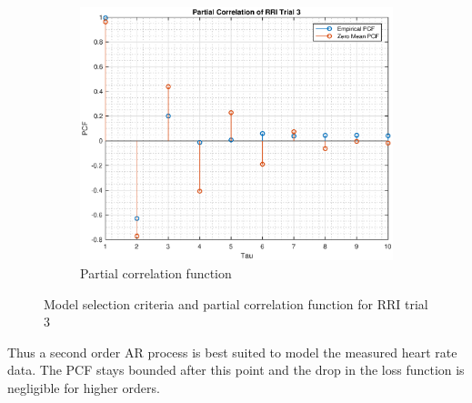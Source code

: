 \documentclass{article}
\begin{document}
\begin{figure}[h!]
\begin{subfigure}{0.32\textwidth}
\centering
\includegraphics[width = \textwidth]{heart_pcf_t3}
\caption{Partial correlation function}
\label{fig:heart_pcf_t3}
\end{subfigure}
\caption{Model selection criteria and partial correlation function for RRI trial 3}
\label{heart_t3}
\end{figure}

Thus a second order AR process is best suited to model the measured heart rate data. The PCF stays bounded after this point and the drop in the loss function is negligible for higher orders.
\end{document}
